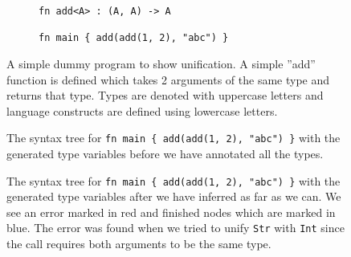 \begin{figure}
\centering
\begin{subfigure}{.5\textwidth}
  \begin{verbatim}
fn add<A> : (A, A) -> A

fn main { add(add(1, 2), "abc") }
\end{verbatim}
  \end{subfigure}
  \caption{A simple dummy program to show unification. A simple ''add'' function is defined which takes 2 arguments of the same type and returns that type. Types are denoted with uppercase letters and language constructs are defined using lowercase letters.}
  \label{fig:progUni}
\end{figure}

\begin{figure}
\centering
{}
  \cprotect\caption{The syntax tree for \verb|fn main { add(add(1, 2), "abc") }| with the generated type variables before we have annotated all the types.}
  \label{fig:progUniTree}
\end{figure}

\begin{figure}
\centering
{}
  \cprotect\caption{The syntax tree for \verb|fn main { add(add(1, 2), "abc") }| with the generated type variables after we have inferred as far as we can. We see an error marked in red and finished nodes which are marked in blue. The error was found when we tried to unify \verb|Str| with \verb|Int| since the call requires both arguments to be the same type.}
  \label{fig:progUniTreeAfter}
\end{figure}


